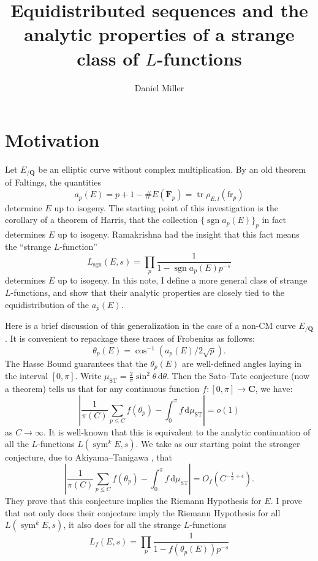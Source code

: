\documentclass{article}
\title{Equidistributed sequences and the analytic properties of a strange class of $L$-functions}
\author{Daniel Miller}
\DeclareMathOperator{\sgn}{sgn}
\DeclareMathOperator{\sym}{sym}
\DeclareMathOperator{\tr}{tr}
\newcommand{\bC}{\mathbf{C}}
\newcommand{\bF}{\mathbf{F}}
\newcommand{\bQ}{\mathbf{Q}}
\newcommand{\dd}{\mathrm{d}}
\newcommand{\fr}{\mathrm{fr}}
\newcommand{\ST}{\mathrm{ST}}
\theoremstyle{definition}
\begin{document}
\maketitle





\section{Motivation}

Let $E_{/\bQ}$ be an elliptic curve without complex multiplication. By an old 
theorem of Faltings, the quantities 
\[
	a_p(E) = p + 1 - \# E(\bF_p) = \tr \rho_{E,l} (\fr_p)
\]
determine $E$ up to isogeny. The starting point of this investigation is the 
corollary of a theorem of Harris, that the collection $\{\sgn a_p(E)\}_p$ in 
fact determines $E$ up to isogeny. Ramakrishna had the insight that this fact 
means the ``strange $L$-function''
\[
	L_{\sgn}(E,s) = \prod_p \frac{1}{1-\sgn a_p(E) p^{-s}} 
\]
determines $E$ up to isogeny. In this note, I define a more general class of 
strange $L$-functions, and show that their analytic properties are closely 
tied to the equidistribution of the $a_p(E)$. 

Here is a brief discussion of this generalization in the case of a non-CM curve 
$E_{/\bQ}$. It is convenient to repackage these traces of 
Frobenius as follows:
\[
	\theta_p(E) = \cos^{-1}(a_p(E)/2\sqrt p) .
\]
The Hasse Bound guarantees that the $\theta_p(E)$ are well-defined angles 
laying in the interval $[0,\pi]$. Write 
$\mu_\ST = \frac{2}{\pi} \sin^2\theta\, \dd\theta$. Then the Sato--Tate 
conjecture (now a theorem) tells us that for any continuous function 
$f\colon [0,\pi]\to \bC$, we have:
\[
	\left| \frac{1}{\pi(C)} \sum_{p\leqslant C} f(\theta_p) - \int_0^\pi f\, \dd \mu_\ST\right| = o(1)
\]
as $C\to \infty$. It is well-known that this is equivalent to the analytic 
continuation of all the $L$-functions $L(\sym^k E,s)$. We take as our starting 
point the stronger conjecture, due to Akiyama--Tanigawa 
\cite{akiyama-tanigawa}, that 
\[
	\left| \frac{1}{\pi(C)} \sum_{p\leqslant C} f(\theta_p) - \int_0^\pi f\, \dd \mu_\ST\right| = O_f(C^{-\frac 1 2+\epsilon}) .
\]
They prove that this conjecture implies the Riemann Hypothesis for $E$. I 
prove that not only does their conjecture imply the Riemann Hypothesis for all 
$L(\sym^k E,s)$, it also does for all the strange $L$-functions 
\[
	L_f(E,s) = \prod_p \frac{1}{1-f(\theta_p(E)) p^{-s}}
\]
\end{document}
